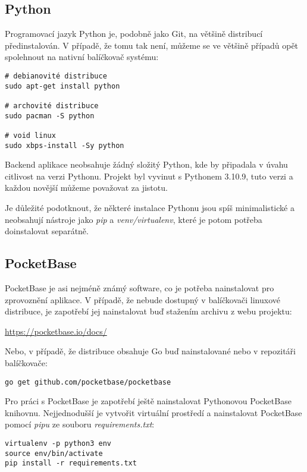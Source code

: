 \documentclass[11pt,a4paper,twoside,openright]{report}
\begin{document}
\subsection{Python}
Programovací jazyk Python je, podobně jako Git, na většině distribucí předinstalován. V případě,
že tomu tak není, můžeme se ve většině případů opět spolehnout na nativní balíčkovač systému: 

\begin{verbatim}
# debianovité distribuce
sudo apt-get install python

# archovité distribuce
sudo pacman -S python

# void linux
sudo xbps-install -Sy python
\end{verbatim}

Backend aplikace neobsahuje žádný složitý Python, kde by připadala v úvahu citlivost na verzi Pythonu.
Projekt byl vyvinut s Pythonem 3.10.9, tuto verzi a každou novější můžeme považovat za jistotu.

Je důležité podotknout, že některé instalace Pythonu jsou spíš minimalistické a neobsahují nástroje
jako \emph{pip} a \emph{venv/virtualenv}, které je potom potřeba doinstalovat separátně.

\subsection{PocketBase}
PocketBase je asi nejméně známý software, co je potřeba nainstalovat pro zprovoznění aplikace.
V případě, že nebude dostupný v balíčkovači linuxové distribuce, je zapotřebí jej nainstalovat
buď stažením archivu z webu projektu:

\url{https://pocketbase.io/docs/}

Nebo, v případě, že distribuce obsahuje Go buď nainstalované nebo v repozitáři balíčkovače:

\begin{verbatim}
go get github.com/pocketbase/pocketbase
\end{verbatim}

Pro práci s PocketBase je zapotřebí ještě nainstalovat Pythonovou PocketBase knihovnu.
Nejjednodušší je vytvořit virtuální prostředí a nainstalovat PocketBase pomocí \emph{pipu}
ze souboru \emph{requirements.txt}:

\begin{verbatim}
virtualenv -p python3 env
source env/bin/activate
pip install -r requirements.txt
\end{verbatim}
\end{document}
